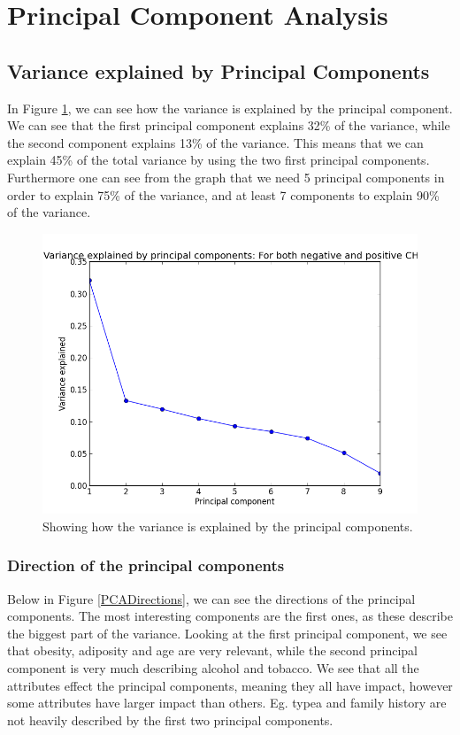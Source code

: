 \section{Principal Component Analysis}

\subsection{Variance explained by Principal Components}

In Figure \ref{VariancePCA}, we can see how the variance is explained by the principal component. We can see that the first principal component explains 32\% of the variance, while the second component explains 13\% of the variance. This means that we can explain 45\% of the total variance by using the two first principal components. Furthermore one can see from the graph that we need 5 principal components in order to explain 75\% of the variance, and at least 7 components to explain 90\% of the variance.

\begin{figure}[H]
\includegraphics[scale=0.75]{pictures/PCAPosAndNeg.png}
\caption{Showing how the variance is explained by the principal components.}
\label{VariancePCA}
\end{figure}

\subsubsection{Direction of the principal components}

Below in Figure \ref{PCADirections}, we can see the directions of the principal components. The most interesting components are the first ones, as these describe the biggest part of the variance. Looking at the first principal component, we see that obesity, adiposity and age are very relevant, while the second principal component is very much describing alcohol and tobacco. We see that all the attributes effect the principal components, meaning they all have impact, however some attributes have larger impact than others. Eg. typea and family history are not heavily described by the first two principal components.

